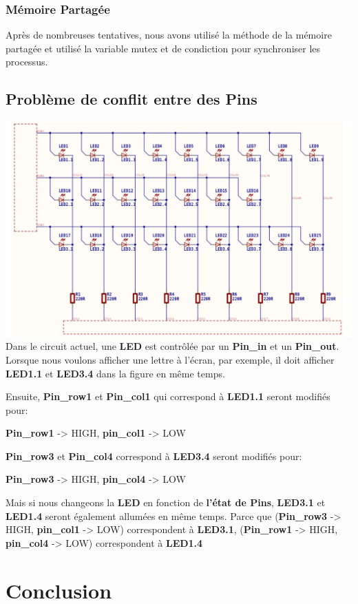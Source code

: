 \documentclass[14px]{article}
\begin{document}
\subsubsection{Mémoire Partagée}
Après de nombreuses tentatives, nous avons utilisé la méthode de la mémoire partagée et utilisé la variable mutex et de condiction pour synchroniser les processus.
\subsection{Problème de conflit entre des Pins}

\includegraphics[width=\textwidth]{pbConflitPins.png}\\[1cm]

Dans le circuit actuel, une \textbf{LED} est contrôlée par un \textbf{Pin\_in} et un \textbf{Pin\_out}.
Lorsque nous voulons afficher une lettre à l'écran, par exemple, il doit afficher \textbf{LED1.1} et \textbf{LED3.4} dans la figure en même temps.

Ensuite, \textbf{Pin\_row1} et \textbf{Pin\_col1} qui correspond à \textbf{LED1.1} seront modifiés pour:

\textbf{Pin\_row1} -> HIGH, \textbf{pin\_col1} -> LOW

\textbf{Pin\_row3} et \textbf{Pin\_col4} correspond à \textbf{LED3.4} seront modifiés pour:

\textbf{Pin\_row3} -> HIGH, \textbf{pin\_col4} -> LOW

Mais si nous changeons la \textbf{LED} en fonction de \textbf{l'état de Pins}, \textbf{LED3.1} et \textbf{LED1.4} seront également allumées en même temps. Parce que (\textbf{Pin\_row3} -> HIGH, \textbf{pin\_col1} -> LOW) correspondent à \textbf{LED3.1}, (\textbf{Pin\_row1} -> HIGH, \textbf{pin\_col4} -> LOW) correspondent à \textbf{LED1.4}


\section{Conclusion}
\end{document}
